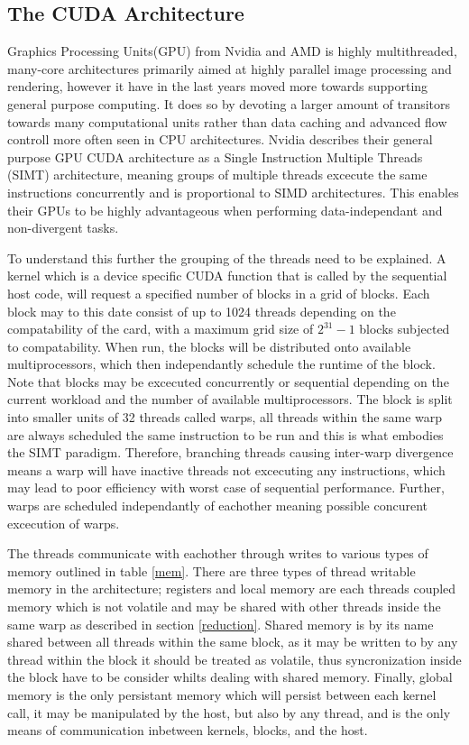 \documentclass{aamas2012}
\begin{document}
\subsection{The CUDA Architecture}
Graphics Processing Units(GPU) from Nvidia and AMD is highly multithreaded, many-core architectures primarily aimed at 
highly parallel image processing and rendering, however it have in the last years moved more towards supporting general purpose computing.
It does so by devoting a larger amount of transitors towards many computational units rather than data caching and advanced 
flow controll more often seen in CPU architectures.
Nvidia describes their general purpose GPU CUDA architecture as a Single Instruction Multiple Threads (SIMT) architecture, 
meaning groups of multiple threads excecute the same instructions concurrently and is proportional to SIMD architectures. 
This enables their GPUs to be highly advantageous when performing data-independant and non-divergent tasks. 

To understand this further the grouping of the threads need to be explained.
A kernel which is a device specific CUDA function that is called by the sequential host code,
will request a specified number of blocks in a grid of blocks.
Each block may to this date consist of up to 1024 threads depending on the compatability of the card, with a maximum
grid size of $2^{31}-1$ blocks subjected to compatability. When run, the blocks will be distributed onto available multiprocessors,
which then independantly schedule the runtime of the block. Note that blocks may be excecuted concurrently or sequential depending on
the current workload and the number of available multiprocessors.
The block is split into smaller units of 32 threads called warps, all threads within the same warp are always scheduled
the same instruction to be run and this is what embodies the SIMT paradigm. 
Therefore, branching threads causing inter-warp divergence means a warp will have inactive threads not excecuting any instructions, 
which may lead to poor efficiency with worst case of sequential performance. Further, warps are scheduled independantly of eachother
meaning possible concurent excecution of warps.

The threads communicate with eachother through writes to various types of memory outlined in table \ref{mem}.
There are three types of thread writable memory in the architecture; registers and local memory are each threads
coupled memory which is not volatile and may be shared with other threads inside the same warp as described in section \ref{reduction}. 
Shared memory is by its name shared between all threads within the same block, as it may be written to by any thread within the block
it should be treated as volatile, thus syncronization inside the block have to be consider whilts dealing with shared memory.
Finally, global memory is the only persistant memory which will persist between each kernel call, it may be manipulated by the host,
but also by any thread, and is the only means of communication inbetween kernels, blocks, and the host.
\end{document}
